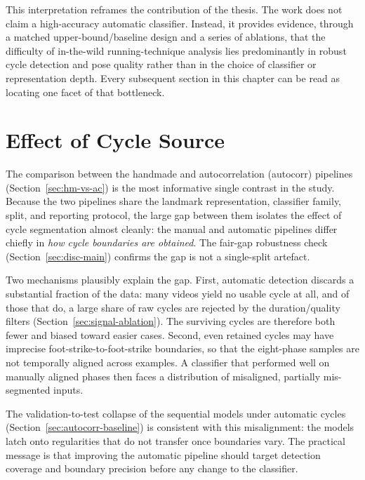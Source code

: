 This interpretation reframes the contribution of the thesis. The work does not
claim a high-accuracy automatic classifier. Instead, it provides evidence,
through a matched upper-bound/baseline design and a series of ablations, that
the difficulty of in-the-wild running-technique analysis lies predominantly in
robust cycle detection and pose quality rather than in the choice of classifier
or representation depth. Every subsequent section in this chapter can be read
as locating one facet of that bottleneck.

\section{Effect of Cycle Source}
\label{sec:disc-cycle-source}

The comparison between the handmade and autocorrelation (autocorr) pipelines
(Section~\ref{sec:hm-vs-ac}) is the most informative single contrast in the
study. Because the two pipelines share the landmark representation, classifier
family, split, and reporting protocol, the large gap between them isolates the
effect of cycle segmentation almost cleanly: the manual and automatic pipelines
differ chiefly in \emph{how cycle boundaries are obtained}. The fair-gap robustness check (Section~\ref{sec:disc-main}) confirms the gap is not a single-split artefact.

Two mechanisms plausibly explain the gap. First, automatic detection discards a
substantial fraction of the data: many videos yield no usable cycle at all, and
of those that do, a large share of raw cycles are rejected by the
duration/quality filters (Section~\ref{sec:signal-ablation}). The surviving
cycles are therefore both fewer and biased toward easier cases. Second, even
retained cycles may have imprecise foot-strike-to-foot-strike boundaries, so
that the eight-phase samples are not temporally aligned across examples. A
classifier that performed well on manually aligned phases then faces a
distribution of misaligned, partially mis-segmented inputs. 

The validation-to-test collapse of the sequential models under automatic cycles
(Section~\ref{sec:autocorr-baseline}) is consistent with this misalignment: the
models latch onto regularities that do not transfer once boundaries vary. The
practical message is that improving the automatic pipeline should target
detection coverage and boundary precision before any change to the classifier.


